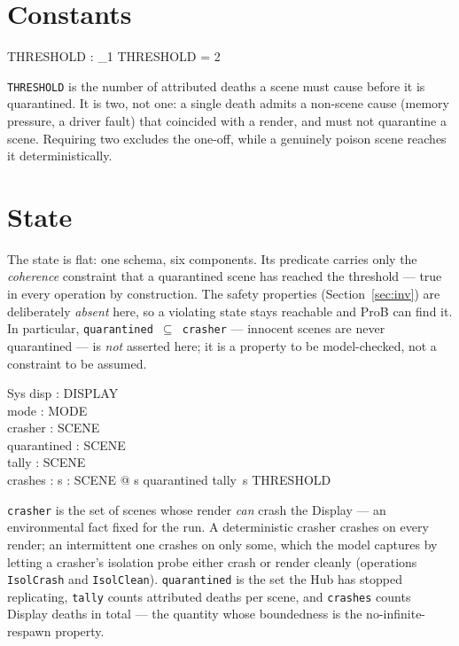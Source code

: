 \documentclass[a4paper,10pt,fleqn]{article}
\begin{document}
\section{Constants}

\begin{axdef}
  THRESHOLD : \nat_1
\where
  THRESHOLD = 2
\end{axdef}

\texttt{THRESHOLD} is the number of attributed deaths a scene must cause before
it is quarantined.  It is two, not one: a single death admits a non-scene cause
(memory pressure, a driver fault) that coincided with a render, and must not
quarantine a scene.  Requiring two excludes the one-off, while a genuinely poison
scene reaches it deterministically.

\section{State}

The state is flat: one schema, six components.  Its predicate carries only the
\emph{coherence} constraint that a quarantined scene has reached the threshold ---
true in every operation by construction.  The safety properties
(Section~\ref{sec:inv}) are deliberately \emph{absent} here, so a violating state
stays reachable and ProB can find it.  In particular, \texttt{quarantined
$\subseteq$ crasher} --- innocent scenes are never quarantined --- is \emph{not}
asserted here; it is a property to be model-checked, not a constraint to be
assumed.

\begin{schema}{Sys}
  disp : DISPLAY \\
  mode : MODE \\
  crasher : \power SCENE \\
  quarantined : \power SCENE \\
  tally : SCENE \fun \nat \\
  crashes : \nat
\where
  \forall s : SCENE @ s \in quarantined \implies tally~s \geq THRESHOLD
\end{schema}

\texttt{crasher} is the set of scenes whose render \emph{can} crash the Display
--- an environmental fact fixed for the run.  A deterministic crasher crashes on
every render; an intermittent one crashes on only some, which the model captures
by letting a crasher's isolation probe either crash or render cleanly (operations
\texttt{IsolCrash} and \texttt{IsolClean}).  \texttt{quarantined} is the set the
Hub has stopped replicating, \texttt{tally} counts attributed deaths per scene,
and \texttt{crashes} counts Display deaths in total --- the quantity whose
boundedness is the no-infinite-respawn property.
\end{document}
